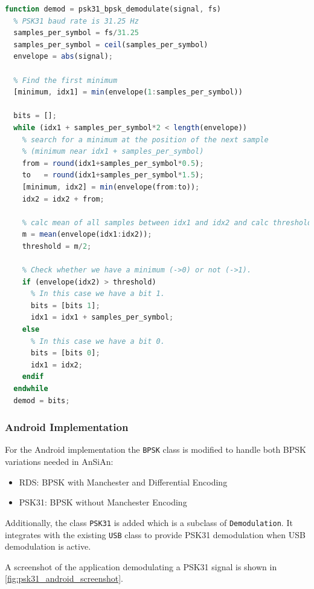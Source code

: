 \begin{lstlisting}[label=lst:octave_psk31_bpsk, caption=Octave implementation of the BPSK demodulation, language=octave]
function demod = psk31_bpsk_demodulate(signal, fs)
  % PSK31 baud rate is 31.25 Hz
  samples_per_symbol = fs/31.25
  samples_per_symbol = ceil(samples_per_symbol)
  envelope = abs(signal);
  
  % Find the first minimum
  [minimum, idx1] = min(envelope(1:samples_per_symbol))
  
  bits = [];
  while (idx1 + samples_per_symbol*2 < length(envelope))
    % search for a minimum at the position of the next sample
    % (minimum near idx1 + samples_per_symbol)
    from = round(idx1+samples_per_symbol*0.5);
    to   = round(idx1+samples_per_symbol*1.5);
    [minimum, idx2] = min(envelope(from:to));
    idx2 = idx2 + from;
    
    % calc mean of all samples between idx1 and idx2 and calc threshold = mean/2
    m = mean(envelope(idx1:idx2));
    threshold = m/2;
    
    % Check whether we have a minimum (->0) or not (->1).
    if (envelope(idx2) > threshold)
      % In this case we have a bit 1.
      bits = [bits 1];
      idx1 = idx1 + samples_per_symbol;
    else
      % In this case we have a bit 0.
      bits = [bits 0];
      idx1 = idx2;
    endif
  endwhile
  demod = bits;
\end{lstlisting}

\subsubsection{Android Implementation}

For the Android implementation the \texttt{BPSK} class is modified to handle both
\ac{BPSK} variations needed in \ac{AnSiAn}:
\begin{itemize}
	\item RDS: BPSK with Manchester and Differential Encoding
	\item PSK31: BPSK without Manchester Encoding
\end{itemize}

Additionally, the class \texttt{PSK31} is added which is a subclass of \texttt{De\-mo\-du\-la\-tion}.
It integrates with the existing \texttt{USB} class to provide PSK31 demodulation
when USB demodulation is active.

A screenshot of the application demodulating a \ac{PSK31} signal is shown in 
\autoref{fig:psk31_android_screenshot}.

